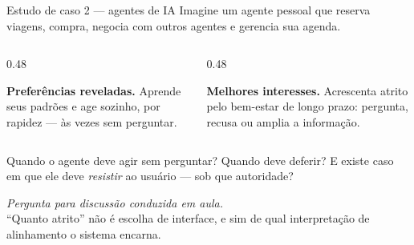 \documentclass[aspectratio=169, 11pt]{beamer}
\newcommand{\paradiscussao}{\smallskip
  {\footnotesize\color{rlCinza}\itshape Pergunta para discussão conduzida em aula.}}
\begin{document}
\begin{frame}{Estudo de caso 2 --- agentes de IA}
  {\small Imagine um agente pessoal que reserva viagens, compra, negocia com
  outros agentes e gerencia sua agenda.}

  \begin{columns}[T]
    \begin{column}{0.48\textwidth}
      \begin{ideiabox}
        \textbf{Preferências reveladas.} Aprende seus padrões e age sozinho,
        por rapidez --- às vezes sem perguntar.
      \end{ideiabox}
    \end{column}
    \begin{column}{0.48\textwidth}
      \begin{alertabox}
        \textbf{Melhores interesses.} Acrescenta atrito pelo bem-estar de longo
        prazo: pergunta, recusa ou amplia a informação.
      \end{alertabox}
    \end{column}
  \end{columns}

  \vspace{-0.3em}
  \begin{quizbox}{}
    Quando o agente deve agir sem perguntar? Quando deve deferir? E existe
    caso em que ele deve \emph{resistir} ao usuário --- sob que autoridade?
  \end{quizbox}
  \paradiscussao\\[-0.2em]
  {\footnotesize\color{rlCinza} ``Quanto atrito'' não é escolha de interface, e
  sim de qual interpretação de alinhamento o sistema encarna.}
\end{frame}
\end{document}
